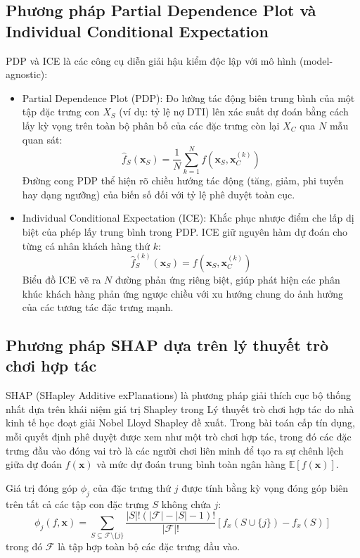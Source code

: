 \documentclass[12pt,a4paper,oneside]{report}
\begin{document}
\subsection{Phương pháp Partial Dependence Plot và Individual Conditional Expectation}
PDP và ICE là các công cụ diễn giải hậu kiểm độc lập với mô hình (model-agnostic):
\begin{itemize}
    \item Partial Dependence Plot (PDP): Đo lường tác động biên trung bình của một tập đặc trưng con $X_S$ (ví dụ: tỷ lệ nợ DTI) lên xác suất dự đoán bằng cách lấy kỳ vọng trên toàn bộ phân bố của các đặc trưng còn lại $X_C$ qua $N$ mẫu quan sát:
    \begin{equation}
        \hat{f}_S(\mathbf{x}_S) = \frac{1}{N} \sum_{k=1}^N f(\mathbf{x}_S, \mathbf{x}_{C}^{(k)})
    \end{equation}
    Đường cong PDP thể hiện rõ chiều hướng tác động (tăng, giảm, phi tuyến hay dạng ngưỡng) của biến số đối với tỷ lệ phê duyệt toàn cục.
    \item Individual Conditional Expectation (ICE): Khắc phục nhược điểm che lấp dị biệt của phép lấy trung bình trong PDP. ICE giữ nguyên hàm dự đoán cho từng cá nhân khách hàng thứ $k$:
    \begin{equation}
        \hat{f}_{S}^{(k)}(\mathbf{x}_S) = f(\mathbf{x}_S, \mathbf{x}_{C}^{(k)})
    \end{equation}
    Biểu đồ ICE vẽ ra $N$ đường phản ứng riêng biệt, giúp phát hiện các phân khúc khách hàng phản ứng ngược chiều với xu hướng chung do ảnh hưởng của các tương tác đặc trưng mạnh.
\end{itemize}

\subsection{Phương pháp SHAP dựa trên lý thuyết trò chơi hợp tác}
SHAP (SHapley Additive exPlanations) là phương pháp giải thích cục bộ thống nhất dựa trên khái niệm giá trị Shapley trong Lý thuyết trò chơi hợp tác do nhà kinh tế học đoạt giải Nobel Lloyd Shapley đề xuất. Trong bài toán cấp tín dụng, mỗi quyết định phê duyệt được xem như một trò chơi hợp tác, trong đó các đặc trưng đầu vào đóng vai trò là các người chơi liên minh để tạo ra sự chênh lệch giữa dự đoán $f(\mathbf{x})$ và mức dự đoán trung bình toàn ngân hàng $\mathbb{E}[f(\mathbf{x})]$.

Giá trị đóng góp $\phi_j$ của đặc trưng thứ $j$ được tính bằng kỳ vọng đóng góp biên trên tất cả các tập con đặc trưng $S$ không chứa $j$:
\begin{equation}
    \phi_j(f, \mathbf{x}) = \sum_{S \subseteq \mathcal{F} \setminus \{j\}} \frac{|S|!(|\mathcal{F}| - |S| - 1)!}{|\mathcal{F}|!} \left[ f_x(S \cup \{j\}) - f_x(S) \right]
\end{equation}
trong đó $\mathcal{F}$ là tập hợp toàn bộ các đặc trưng đầu vào.
\end{document}
